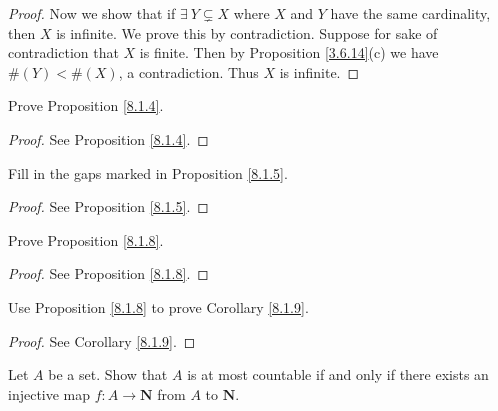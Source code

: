 \begin{proof}
    Now we show that if \(\exists\ Y \subsetneq X\) where \(X\) and \(Y\) have the same cardinality, then \(X\) is infinite.
    We prove this by contradiction.
    Suppose for sake of contradiction that \(X\) is finite.
    Then by Proposition \ref{3.6.14}(c) we have \(\#(Y) < \#(X)\), a contradiction.
    Thus \(X\) is infinite.
\end{proof}

\begin{exercise}\label{ex 8.1.2}
    Prove Proposition \ref{8.1.4}.
\end{exercise}

\begin{proof}
    See Proposition \ref{8.1.4}.
\end{proof}

\begin{exercise}\label{ex 8.1.3}
    Fill in the gaps marked in Proposition \ref{8.1.5}.
\end{exercise}

\begin{proof}
    See Proposition \ref{8.1.5}.
\end{proof}

\begin{exercise}\label{ex 8.1.4}
    Prove Proposition \ref{8.1.8}.
\end{exercise}

\begin{proof}
    See Proposition \ref{8.1.8}.
\end{proof}

\begin{exercise}\label{ex 8.1.5}
    Use Proposition \ref{8.1.8} to prove Corollary \ref{8.1.9}.
\end{exercise}

\begin{proof}
    See Corollary \ref{8.1.9}.
\end{proof}

\begin{exercise}\label{ex 8.1.6}
    Let \(A\) be a set.
    Show that \(A\) is at most countable if and only if there exists an injective map \(f : A \to \mathbf{N}\) from \(A\) to \(\mathbf{N}\).
\end{exercise}

